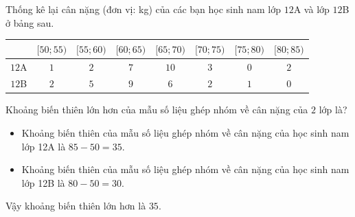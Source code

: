 \begin{bt}%
	Thống kê lại cân nặng (đơn vị: kg) của các bạn học sinh nam lớp $12$A và lớp $12$B ở bảng sau.
	\begin{center}
		\begin{tabular}{|c|c|c|c|c|c|c|c|}
			\hline \diagbox[width=8em]{Lớp}{Cân nặng}  & {$[50 ; 55)$} & {$[55 ; 60)$} & {$[60 ; 65)$} & {$[65 ; 70)$} & {$[70 ; 75)$} & {$[75 ; 80)$} & {$[80 ; 85)$} \\
			\hline $12$A & $1$ & $2$ & $7$ & $10$ & $3$ & $0$ & $2$ \\
			\hline $12$B & $2$ & $5$ & $9$ & $6$ & $2$ & $1$ & $0$ \\
			\hline
		\end{tabular}
	\end{center}
	Khoảng biến thiên lớn hơn của mẫu số liệu ghép nhóm về cân nặng của $2$ lớp là?
	\loigiai
	{
		\begin{itemize}
			\item Khoảng biến thiên của mẫu số liệu ghép nhóm về cân nặng của học sinh nam lớp 12A là $85-50=35$.
			\item Khoảng biến thiên của mẫu số liệu ghép nhóm về cân nặng của học sinh nam lớp 12B là $80-50=30$.
		\end{itemize}
		Vậy khoảng biến thiên lớn hơn là $35$.
	}
\end{bt}

